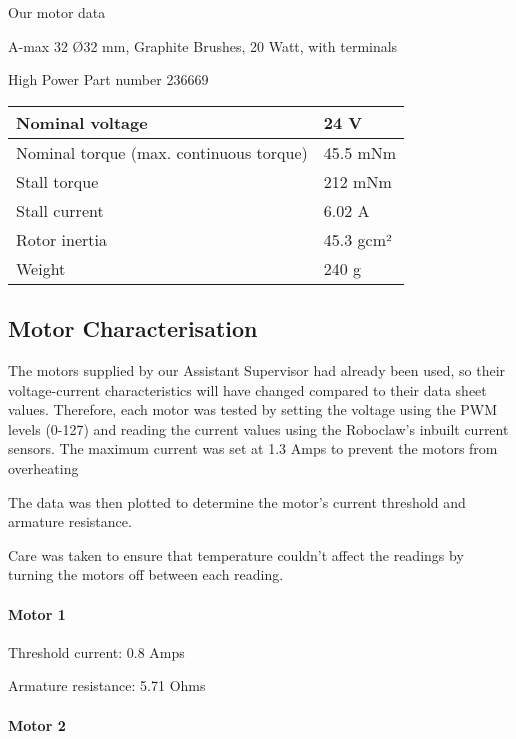 Our motor data

A-max 32 Ø32 mm, Graphite Brushes, 20 Watt, with terminals

High Power Part number 236669

\begin{longtable}[]{@{}ll@{}}
  \toprule
  Nominal voltage & 24 V\tabularnewline
  \midrule
  \endhead
  Nominal torque (max. continuous torque) & 45.5 mNm\tabularnewline
  Stall torque & 212 mNm\tabularnewline
  Stall current & 6.02 A\tabularnewline
  Rotor inertia & 45.3 gcm²\tabularnewline
  Weight & 240 g\tabularnewline
  \bottomrule
\end{longtable}

\subsection{Motor Characterisation}\label{sub:motor-characterisation}

The motors supplied by our Assistant Supervisor had already been used,
so their voltage-current characteristics will have changed compared to
their data sheet values. Therefore, each motor was tested by setting the
voltage using the PWM levels (0-127) and reading the current values
using the Roboclaw's inbuilt current sensors. The maximum current was
set at 1.3 Amps to prevent the motors from overheating

The data was then plotted to determine the motor's current threshold and
armature resistance.

Care was taken to ensure that temperature couldn't affect the readings
by turning the motors off between each reading.

\paragraph{Motor 1}\label{par:motor-1}


Threshold current: 0.8 Amps

Armature resistance: 5.71 Ohms

\paragraph{Motor 2}\label{par:motor-2}


